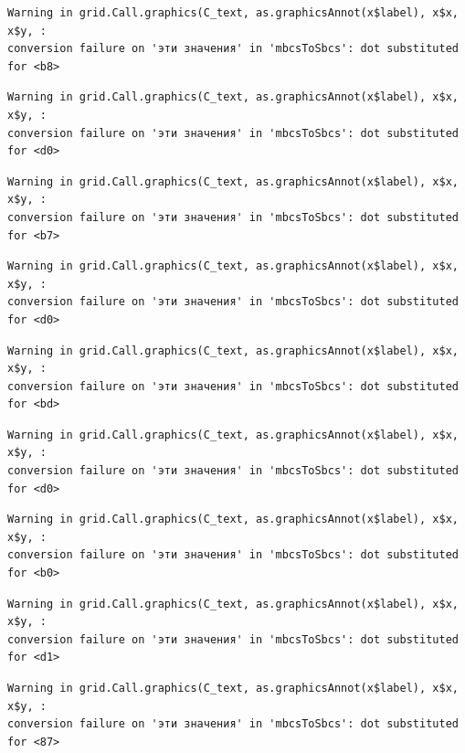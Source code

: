 \documentclass[
  letterpaper,
]{scrbook}
\theoremstyle{definition}
\theoremstyle{remark}
\begin{document}
\begin{verbatim}
Warning in grid.Call.graphics(C_text, as.graphicsAnnot(x$label), x$x, x$y, :
conversion failure on 'эти значения' in 'mbcsToSbcs': dot substituted for <b8>
\end{verbatim}

\begin{verbatim}
Warning in grid.Call.graphics(C_text, as.graphicsAnnot(x$label), x$x, x$y, :
conversion failure on 'эти значения' in 'mbcsToSbcs': dot substituted for <d0>
\end{verbatim}

\begin{verbatim}
Warning in grid.Call.graphics(C_text, as.graphicsAnnot(x$label), x$x, x$y, :
conversion failure on 'эти значения' in 'mbcsToSbcs': dot substituted for <b7>
\end{verbatim}

\begin{verbatim}
Warning in grid.Call.graphics(C_text, as.graphicsAnnot(x$label), x$x, x$y, :
conversion failure on 'эти значения' in 'mbcsToSbcs': dot substituted for <d0>
\end{verbatim}

\begin{verbatim}
Warning in grid.Call.graphics(C_text, as.graphicsAnnot(x$label), x$x, x$y, :
conversion failure on 'эти значения' in 'mbcsToSbcs': dot substituted for <bd>
\end{verbatim}

\begin{verbatim}
Warning in grid.Call.graphics(C_text, as.graphicsAnnot(x$label), x$x, x$y, :
conversion failure on 'эти значения' in 'mbcsToSbcs': dot substituted for <d0>
\end{verbatim}

\begin{verbatim}
Warning in grid.Call.graphics(C_text, as.graphicsAnnot(x$label), x$x, x$y, :
conversion failure on 'эти значения' in 'mbcsToSbcs': dot substituted for <b0>
\end{verbatim}

\begin{verbatim}
Warning in grid.Call.graphics(C_text, as.graphicsAnnot(x$label), x$x, x$y, :
conversion failure on 'эти значения' in 'mbcsToSbcs': dot substituted for <d1>
\end{verbatim}

\begin{verbatim}
Warning in grid.Call.graphics(C_text, as.graphicsAnnot(x$label), x$x, x$y, :
conversion failure on 'эти значения' in 'mbcsToSbcs': dot substituted for <87>
\end{verbatim}
\end{document}
